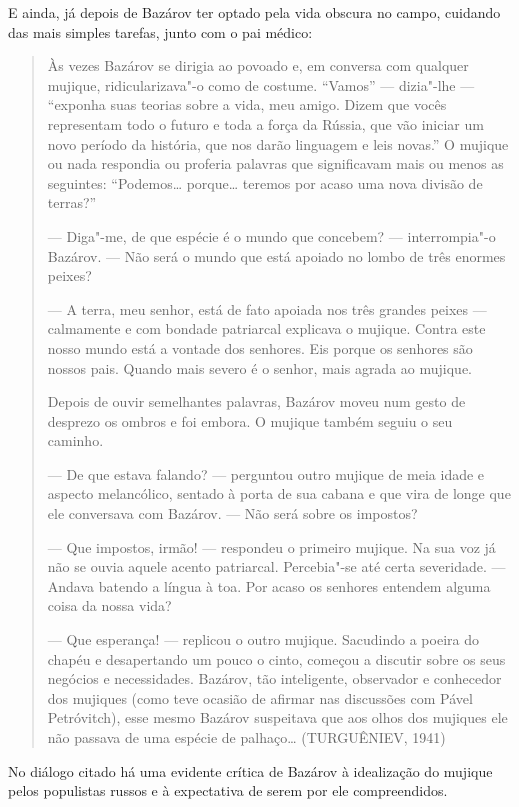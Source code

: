 E ainda, já depois de Bazárov ter optado pela vida obscura no campo, cuidando das mais simples tarefas, junto com o pai médico:

\begin{quote}
Às vezes Bazárov se dirigia ao povoado e, em conversa com qualquer mujique, ridicularizava"-o como de costume. ``Vamos'' --- dizia"-lhe --- ``exponha suas teorias sobre a vida, meu amigo. Dizem que vocês representam todo o futuro e toda a força da Rússia, que vão iniciar um novo período da história, que nos darão linguagem e leis novas.'' O mujique ou nada respondia ou proferia palavras que significavam mais ou menos as seguintes: ``Podemos\ldots{} porque\ldots{} teremos por acaso uma nova divisão
de terras?''

--- Diga"-me, de que espécie é o mundo que concebem? ---
interrompia"-o Bazárov. --- Não será o mundo que está apoiado no
lombo de três enormes peixes?

--- A terra, meu senhor, está de fato apoiada nos três grandes peixes --- calmamente e com bondade patriarcal explicava o mujique. Contra este nosso mundo está a vontade dos senhores. Eis porque os senhores são nossos pais. Quando mais severo é o senhor, mais agrada ao mujique.

Depois de ouvir semelhantes palavras, Bazárov moveu num gesto de
desprezo os ombros e foi embora. O mujique também seguiu o seu caminho.

--- De que estava falando? --- perguntou outro mujique de meia idade e
aspecto melancólico, sentado à porta de sua cabana e que vira de longe
que ele conversava com Bazárov. --- Não será sobre os impostos?

--- Que impostos, irmão! --- respondeu o primeiro mujique. Na sua voz já não se ouvia aquele acento patriarcal. Percebia"-se até certa severidade. --- Andava batendo a língua à toa. Por acaso os senhores entendem alguma coisa da nossa vida?

--- Que esperança! --- replicou o outro mujique. Sacudindo a poeira do chapéu e desapertando um pouco o cinto, começou a discutir sobre os seus negócios e necessidades. Bazárov, tão inteligente, observador e conhecedor dos mujiques (como teve ocasião de afirmar nas discussões com Pável Petróvitch), esse mesmo Bazárov suspeitava que aos olhos dos mujiques ele não passava de uma espécie de palhaço\ldots{} (TURGUÊNIEV, 1941)
\end{quote}

No diálogo citado há uma evidente crítica de Bazárov à idealização do
mujique pelos populistas russos e à expectativa de serem por ele
compreendidos.

